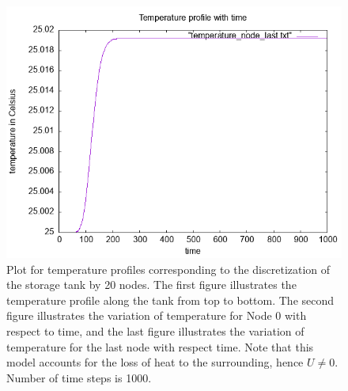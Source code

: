 \documentclass{article}
\begin{document}
\begin{figure}[ht]
\includegraphics[scale =0.5]{figures/temperature_node_last_N_20.png}
\caption{Plot for temperature profiles corresponding to the discretization of the storage tank by 20 nodes. The first figure illustrates the temperature profile along the tank from top to bottom. The second figure illustrates the variation of temperature for Node 0 with respect to time, and the last figure illustrates the variation of temperature for the last node with respect time. Note that this model accounts for the loss of heat to the surrounding, hence $U \neq 0$. Number of time steps is 1000.}
\end{figure}
\end{document}
